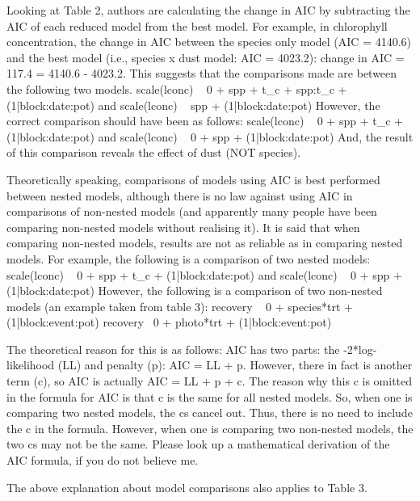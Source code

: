 \documentclass[parskip=half]{scrartcl}
\begin{document}
Looking at Table 2, authors are calculating the change in AIC by subtracting the AIC of each reduced model from the best model.
For example, in chlorophyll concentration, the change in AIC between the species only model (AIC = 4140.6) and the best model (i.e., species x dust model: AIC = 4023.2): change in AIC = 117.4 = 4140.6 - 4023.2.
This suggests that the comparisons made are between the following two models.
scale(lconc) ~ 0 + spp + t_c + spp:t_c + (1|block:date:pot) and
scale(lconc) ~ spp + (1|block:date:pot)
However, the correct comparison should have been as follows:
scale(lconc) ~ 0 + spp + t_c + (1|block:date:pot) and
scale(lconc) ~ 0 + spp + (1|block:date:pot)
And, the result of this comparison reveals the effect of dust (NOT species).

Theoretically speaking, comparisons of models using AIC is best performed between nested models, although there is no law against using AIC in comparisons of non-nested models (and apparently many people have been comparing non-nested models without realising it). It is said that when comparing non-nested models, results are not as reliable as in comparing nested models.
For example, the following is a comparison of two nested models:
scale(lconc) ~ 0 + spp + t_c + (1|block:date:pot) and
scale(lconc) ~ 0 + spp + (1|block:date:pot)
However, the following is a comparison of two non-nested models (an example taken from table 3):
recovery ~ 0 + species*trt + (1|block:event:pot)
recovery~ 0 + photo*trt + (1|block:event:pot)

The theoretical reason for this is as follows:
AIC has two parts: the -2*log-likelihood (LL) and penalty (p): AIC = LL + p.
However, there in fact is another term (c), so AIC is actually AIC = LL + p + c.
The reason why this c is omitted in the formula for AIC is that c is the same for all nested models.
So, when one is comparing two nested models, the cs cancel out. 
Thus, there is no need to include the c in the formula.
However, when one is comparing two non-nested models, the two cs may not be the same.
Please look up a mathematical derivation of the AIC formula, if you do not believe me.

The above explanation about model comparisons also applies to Table 3.
\end{document}
